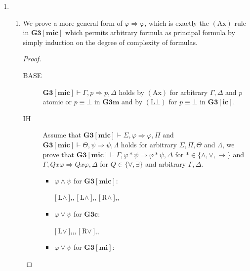\documentclass[12pt]{article}
\newcommand\A{\varphi}
\newcommand\B{\psi}
\newcommand\GG\Gamma
\newcommand\D\Delta
\newcommand\T\Theta
\newcommand\LL\Lambda
\newcommand\SM\Sigma
\newcommand\PP\Pi
\newcommand\TO\Rightarrow
\newcommand\PC[1]{\mathbf{#1}}
\newcommand\AX{\textrm{Ax}}
\newcommand\LB{\textrm{L$\bot$}}
\newcommand\LA{\textrm{L$\land$}}
\newcommand\RA{\textrm{R$\land$}}
\newcommand\LO{\textrm{L$\lor$}}
\newcommand\RO{\textrm{R$\lor$}}
\begin{document}
\begin{enumerate}
    \item \begin{enumerate}
        \item We prove a more general form of $\A\TO\A$, which is exactly the $(\AX)$ rule in $\PC{G3[mic]}$ which permits arbitrary formula as principal formula by simply induction on the degree of complexity of formulas.
        \begin{proof}\ 
        \begin{description}
                \item[BASE] $\PC{G3[mic]}\vdash\GG,p\TO p,\D$ holds by $(\AX)$ for  arbitrary $\GG,\D$ and $p$ atomic or $p\equiv\bot$ in $\PC{G3m}$ and by $(\LB)$ for $p\equiv\bot$ in $\PC{G3[ic]}$.
                \item[IH] Assume that $\PC{G3[mic]}\vdash\SM,\A\TO\A,\PP$ and $\PC{G3[mic]}\vdash\T,\B\TO\B,\LL$ holds for arbitrary $\SM,\PP,\T$ and $\LL$, we prove that $\PC{G3[mic]}\vdash\GG,\A*\B\TO\A*\B,\D$ for $*\in\{\land,\lor,\to\}$ and $\GG,Qx\A\TO Qx\A,\D$ for $Q\in\{\forall,\exists\}$ and arbitrary $\GG,\D$.
                \begin{itemize}
                    \item $\A\land\B$ for $\PC{G3[mic]}$:\quad \begin{prooftree}
                        \hypo{}
                        \ellipsis{IH}{\GG,\A,\B\TO\A,\D}
                        [$\LA$]{\GG,\A\land\B\TO\A,\D}
                        \hypo{}
                        \ellipsis{IH}{\GG,\A,\B\TO\B,\D}
                        [$\LA$]{\GG,\A\land\B\TO\B,\D}
                        [$\RA$]{\GG,\A\land\B\TO\A\land\B,\D}
                    \end{prooftree}
                    \item $\A\lor\B$ for $\PC{G3c}$:\quad \begin{prooftree}
                        \hypo{}
                        \ellipsis{IH}{\GG,\A\TO\A,\B,\D}
                        \hypo{}
                        \ellipsis{IH}{\GG,\B\TO\A,\B,\D}
                        [$\LO$]{\GG,\A\lor\B\TO\A,\B,\D}
                        [$\RO$]{\GG,\A\lor\B\TO\A\lor\B,\D}
                    \end{prooftree}
                    \item $\A\lor\B$ for $\PC{G3[mi]}$:\quad \begin{prooftree}
                        \hypo{}
                        \ellipsis{IH}{\GG,\A\TO\A}

\end{prooftree}
\end{itemize}
\end{description}
\end{proof}
\end{enumerate}
\end{enumerate}
\end{document}
